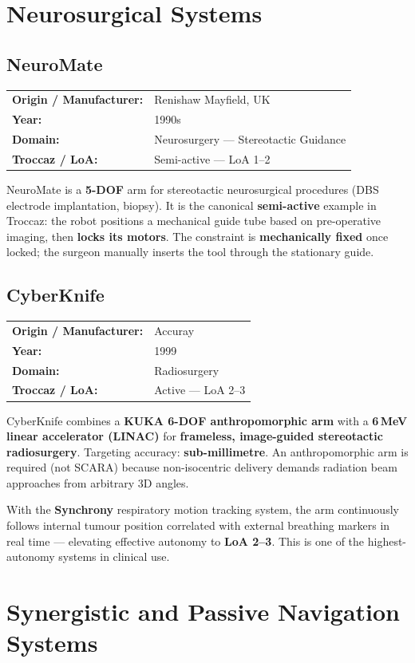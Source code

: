 \documentclass[11pt,a4paper,twoside]{report}
\makeatletter
\newcommand{\robotmeta}[4]{%
  \noindent\begin{tabular}{@{}ll@{}}
    \textbf{Origin / Manufacturer:} & #1 \\
    \textbf{Year:}                  & #2 \\
    \textbf{Domain:}                & #3 \\
    \textbf{Troccaz / LoA:}         & #4 \\
  \end{tabular}\par\smallskip\noindent}
\makeatother
\begin{document}
\chapter{Neurosurgical Systems}

\section{NeuroMate}
\robotmeta{Renishaw Mayfield, UK}{1990s}{Neurosurgery — Stereotactic Guidance}{Semi-active — LoA 1--2}
NeuroMate is a \textbf{5-DOF} arm for stereotactic neurosurgical procedures (DBS electrode implantation, biopsy). It is the canonical \textbf{semi-active} example in Troccaz: the robot positions a mechanical guide tube based on pre-operative imaging, then \textbf{locks its motors}. The constraint is \textbf{mechanically fixed} once locked; the surgeon manually inserts the tool through the stationary guide.

\section{CyberKnife}
\robotmeta{Accuray}{1999}{Radiosurgery}{Active — LoA 2--3}
CyberKnife combines a \textbf{KUKA 6-DOF anthropomorphic arm} with a \textbf{6\,MeV linear accelerator (LINAC)} for \textbf{frameless, image-guided stereotactic radiosurgery}. Targeting accuracy: \textbf{sub-millimetre}. An anthropomorphic arm is required (not SCARA) because non-isocentric delivery demands radiation beam approaches from arbitrary 3D angles.

With the \textbf{Synchrony} respiratory motion tracking system, the arm continuously follows internal tumour position correlated with external breathing markers in real time — elevating effective autonomy to \textbf{LoA 2--3}. This is one of the highest-autonomy systems in clinical use.

\chapter{Synergistic and Passive Navigation Systems}
\end{document}
